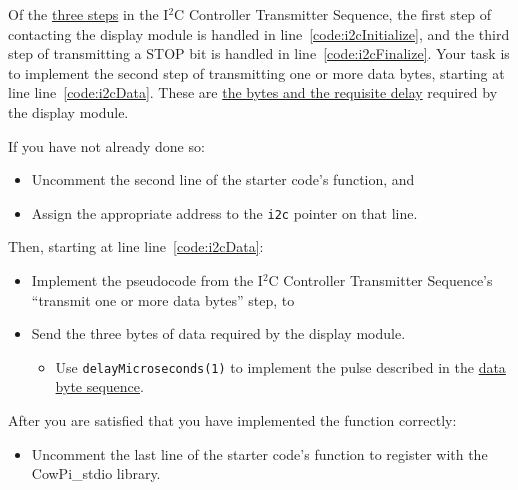 Of the \href{https://cow-pi.readthedocs.io/en/latest/microcontroller.html#controller-transmitter-sequence}{three steps} in the I$^2$C Controller Transmitter Sequence, the first step of contacting the display module is handled in line~\ref{code:i2cInitialize},
and the third step of transmitting a STOP bit is handled in line~\ref{code:i2cFinalize}.
Your task is to implement the second step of transmitting one or more data bytes, starting at line line~\ref{code:i2cData}.
These are \href{https://cow-pi.readthedocs.io/en/latest/hardware/outputs.html#hd44780-driven-lcd-character-display}{the bytes and the requisite delay} required by the display module.

If you have not already done so:

\begin{itemize}
    \item Uncomment the second line of the starter code's  function, and
    \item Assign the appropriate address to the \lstinline{i2c} pointer on that line.
\end{itemize}

Then, starting at line line~\ref{code:i2cData}:

\begin{itemize}
    \item Implement the pseudocode from the I$^2$C Controller Transmitter Sequence's ``transmit one or more data bytes'' step, to
    \item Send the three bytes of data required by the display module.
        \begin{itemize}
            \item Use \lstinline{delayMicroseconds(1)} to implement the pulse described in the \href{https://cow-pi.readthedocs.io/en/latest/hardware/outputs.html#data-byte-sequence}{data byte sequence}.
        \end{itemize}
\end{itemize}

After you are satisfied that you have implemented the  function correctly:

\begin{itemize}
    \item Uncomment the last line of the starter code's  function to register  with the CowPi\_stdio library.
\end{itemize}

